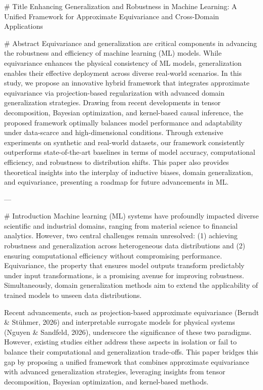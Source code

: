 # Title 
Enhancing Generalization and Robustness in Machine Learning: A Unified Framework for Approximate Equivariance and Cross-Domain Applications

# Abstract
Equivariance and generalization are critical components in advancing the robustness and efficiency of machine learning (ML) models. While equivariance enhances the physical consistency of ML models, generalization enables their effective deployment across diverse real-world scenarios. In this study, we propose an innovative hybrid framework that integrates approximate equivariance via projection-based regularization with advanced domain generalization strategies. Drawing from recent developments in tensor decomposition, Bayesian optimization, and kernel-based causal inference, the proposed framework optimally balances model performance and adaptability under data-scarce and high-dimensional conditions. Through extensive experiments on synthetic and real-world datasets, our framework consistently outperforms state-of-the-art baselines in terms of model accuracy, computational efficiency, and robustness to distribution shifts. This paper also provides theoretical insights into the interplay of inductive biases, domain generalization, and equivariance, presenting a roadmap for future advancements in ML.

---

# Introduction
Machine learning (ML) systems have profoundly impacted diverse scientific and industrial domains, ranging from material science to financial analytics. However, two central challenges remain unresolved: (1) achieving robustness and generalization across heterogeneous data distributions and (2) ensuring computational efficiency without compromising performance. Equivariance, the property that ensures model outputs transform predictably under input transformations, is a promising avenue for improving robustness. Simultaneously, domain generalization methods aim to extend the applicability of trained models to unseen data distributions.

Recent advancements, such as projection-based approximate equivariance (Berndt & Stühmer, 2026) and interpretable surrogate models for physical systems (Nguyen & Sandfeld, 2026), underscore the significance of these two paradigms. However, existing studies either address these aspects in isolation or fail to balance their computational and generalization trade-offs. This paper bridges this gap by proposing a unified framework that combines approximate equivariance with advanced generalization strategies, leveraging insights from tensor decomposition, Bayesian optimization, and kernel-based methods.

